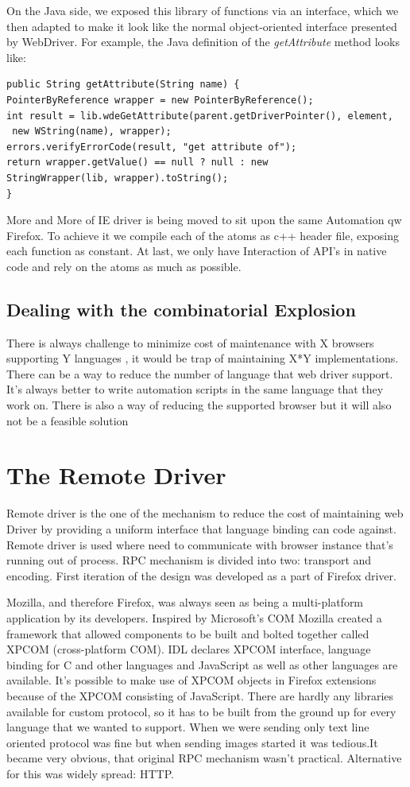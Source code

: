 \documentclass[12pt]{report}
\begin{document}
On the Java side, we exposed this library of functions via an interface, which we then adapted to make it look like the normal object-oriented interface presented by WebDriver. For example, the Java definition of the \textit{getAttribute} method looks like:
\begin{verbatim}
public String getAttribute(String name) {
PointerByReference wrapper = new PointerByReference();
int result = lib.wdeGetAttribute(parent.getDriverPointer(), element,
 new WString(name), wrapper);
errors.verifyErrorCode(result, "get attribute of");
return wrapper.getValue() == null ? null : new
StringWrapper(lib, wrapper).toString();
}
\end{verbatim}
More and More of IE driver is being moved to sit upon the same Automation qw Firefox. To achieve it we compile each of the atoms as c++ header file, exposing each function as constant. At last, we only have Interaction of API’s in native code and rely on the atoms as much as possible.

\subsection*{Dealing with the combinatorial Explosion}
There is always challenge to minimize cost of maintenance with X browsers supporting Y languages , it would be trap of maintaining X*Y implementations. There can be a way to reduce the number of language that web driver support. It’s always better to write automation scripts in the same language that they work on. There is also a way of reducing the supported browser but it will also not be a feasible solution

\section*{The Remote Driver}
Remote driver is the one of the mechanism to reduce the cost of maintaining web Driver by providing a uniform interface that language binding can code against. Remote driver is used where need to communicate with browser instance that’s running out of process. RPC mechanism is divided into two: transport and encoding. First iteration of the design was developed as a part of Firefox driver. 

Mozilla, and therefore Firefox, was always seen as being a multi-platform application by its developers. Inspired by Microsoft's COM Mozilla created a framework that allowed components to be built and bolted together called XPCOM (cross-platform COM).  IDL declares XPCOM interface, language binding for C and other languages  and JavaScript as well as other languages are available. It's possible to make use of XPCOM objects in Firefox extensions because of the XPCOM consisting of JavaScript.
 There are hardly any libraries available for custom protocol, so it has to be built from the ground up for every language that we wanted to support. When we were sending only text line oriented protocol was fine but when sending images started it was tedious.It became very obvious, that original RPC mechanism wasn't practical. Alternative for this was widely spread: HTTP. 
\end{document}
